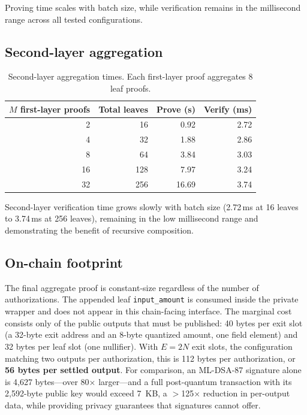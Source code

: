 \documentclass{iacrcc}
\begin{document}
Proving time scales with batch size, while verification remains in the millisecond range across all tested configurations.

\subsection{Second-layer aggregation}

\begin{table}[t]
\centering
\small
\begin{tabular}{@{}rrrr@{}}
\toprule
\(M\) first-layer proofs & Total leaves & Prove (s) & Verify (ms) \\
\midrule
2  & 16  & 0.92 & 2.72 \\
4  & 32  & 1.88 & 2.86 \\
8  & 64  & 3.84 & 3.03 \\
16 & 128 & 7.97 & 3.24 \\
32 & 256 & 16.69 & 3.74 \\
\bottomrule
\end{tabular}
\caption{Second-layer aggregation times. Each first-layer proof aggregates 8 leaf proofs.}
\label{tab:layer1-results}
\end{table}

Second-layer verification time grows slowly with batch size (2.72\,ms at 16 leaves to 3.74\,ms at 256 leaves), remaining in the low millisecond range and demonstrating the benefit of recursive composition.

\subsection{On-chain footprint}

The final aggregate proof is constant-size regardless of the number of authorizations. The appended leaf \texttt{input\_amount} is consumed inside the private wrapper and does not appear in this chain-facing interface. The marginal cost consists only of the public outputs that must be published: 40 bytes per exit slot (a 32-byte exit address and an 8-byte quantized amount, one field element) and 32 bytes per leaf slot (one nullifier). With \(E = 2N\) exit slots, the configuration matching two outputs per authorization, this is 112 bytes per authorization, or \textbf{56 bytes per settled output}. For comparison, an ML-DSA-87 signature alone is 4,627 bytes---over 80$\times$ larger---and a full post-quantum transaction with its 2,592-byte public key would exceed 7~KB, a $>$125$\times$ reduction in per-output data, while providing privacy guarantees that signatures cannot offer.
\end{document}

